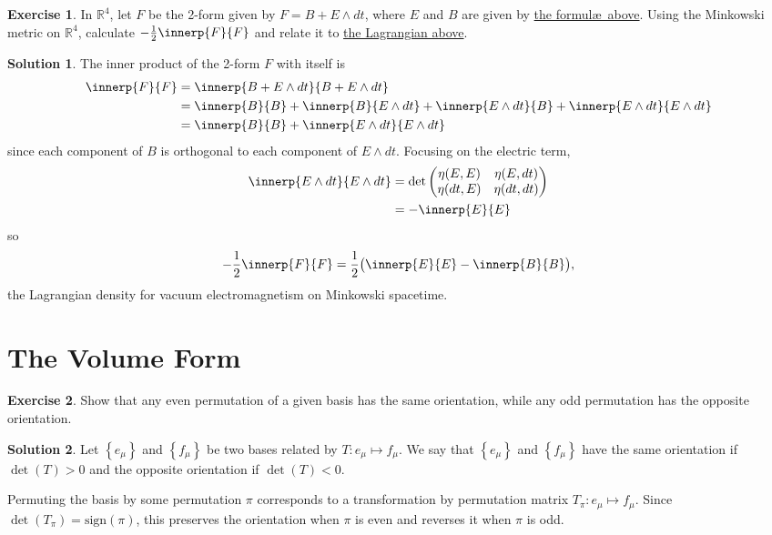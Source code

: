 \documentclass[11pt, a4paper]{report}
\theoremstyle{definition}
\newtheorem{ex}{Exercise}[part]
\newtheorem{sol}{Solution}[part]
\begin{document}
\begin{ex}

In $\mathbb{R}^4$, let $F$ be the 2-form given by $F = B + E \wedge dt$, where $E$ and $B$ are given by \hyperref[ex:esquaredbsquared]{the formul\ae\ above}. Using the Minkowski metric on $\mathbb{R}^4$, calculate $-\frac{1}{2} \innerp{F}{F}$ and relate it to \hyperref[eq:lagrangianvacuumem]{the Lagrangian above}.

\end{ex}

\begin{sol}

The inner product of the 2-form $F$ with itself is
\begin{align*}
    \innerp{F}{F} &= \innerp{B + E \wedge dt}{B + E \wedge dt} \\
        &= \innerp{B}{B} + \innerp{B}{E \wedge dt} + \innerp{E \wedge dt}{B} + \innerp{E \wedge dt}{E \wedge dt} \\
        &= \innerp{B}{B} + \innerp{E \wedge dt}{E \wedge dt}
\end{align*}
since each component of $B$ is orthogonal to each component of $E \wedge dt$.
Focusing on the electric term,
\begin{align*}
    \innerp{E \wedge dt}{E \wedge dt} &= \det \begin{pmatrix}
                \eta(E, E) & \eta(E, dt) \\
                \eta(dt, E) & \eta(dt, dt)
            \end{pmatrix} \\
        &= -\innerp{E}{E}
\end{align*}
so
\[
    -\frac{1}{2} \innerp{F}{F} = \frac{1}{2} \bigl( \innerp{E}{E} - \innerp{B}{B} \bigr),
\]
the Lagrangian density for vacuum electromagnetism on Minkowski spacetime.

\end{sol}

\section{The Volume Form}

\begin{ex}

Show that any even permutation of a given basis has the same orientation, while any odd permutation has the opposite orientation.

\end{ex}

\begin{sol}

Let $\left\{e_\mu\right\}$ and $\left\{f_\mu\right\}$ be two bases related by $T: e_\mu \mapsto f_\mu$. We say that $\left\{e_\mu\right\}$ and $\left\{f_\mu\right\}$ have the same orientation if $\det(T) > 0$ and the opposite orientation if $\det(T) < 0$.

Permuting the basis by some permutation $\pi$ corresponds to a transformation by permutation matrix $T_\pi: e_\mu \mapsto f_\mu$. Since $\det(T_\pi) = \text{sign}(\pi)$, this preserves the orientation when $\pi$ is even and reverses it when $\pi$ is odd.

\end{sol}
\end{document}
